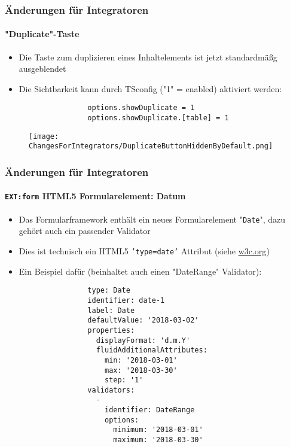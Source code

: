 \begin{frame}[fragile]
	\frametitle{Änderungen für Integratoren}
	\framesubtitle{"Duplicate"-Taste}

	\lstset{basicstyle=\smaller\ttfamily}

	\begin{itemize}
		\item Die Taste zum duplizieren eines Inhaltelements ist jetzt standardmäßg ausgeblendet
		\item Die Sichtbarkeit kann durch TSconfig ("1" = enabled) aktiviert werden:

			\begin{lstlisting}
				options.showDuplicate = 1
				options.showDuplicate.[table] = 1
			\end{lstlisting}

	\end{itemize}
	\vspace{-0.5cm}
	\begin{figure}
		\texttt{[image: ChangesForIntegrators/DuplicateButtonHiddenByDefault.png]}
	\end{figure}

\end{frame}


\begin{frame}[fragile]
	\frametitle{Änderungen für Integratoren}
	\framesubtitle{\texttt{EXT:form} HTML5 Formularelement: Datum}

	\lstset{basicstyle=\tiny\ttfamily}

	\begin{itemize}
		\item Das Formularframework enthält ein neues Formularelement "\texttt{Date}",
			dazu gehört auch ein passender Validator
		\item Dies ist technisch ein HTML5 \texttt{'type=date'} Attribut
			(siehe \href{https://www.w3.org/TR/2011/WD-html-markup-20110405/input.date.html}{w3c.org})
		\item Ein Beispiel dafür (beinhaltet auch einen "DateRange" Validator):

			\begin{lstlisting}
				type: Date
				identifier: date-1
				label: Date
				defaultValue: '2018-03-02'
				properties:
				  displayFormat: 'd.m.Y'
				  fluidAdditionalAttributes:
				    min: '2018-03-01'
				    max: '2018-03-30'
				    step: '1'
				validators:
				  -
				    identifier: DateRange
				    options:
				      minimum: '2018-03-01'
				      maximum: '2018-03-30'
			\end{lstlisting}

	\end{itemize}

\end{frame}

